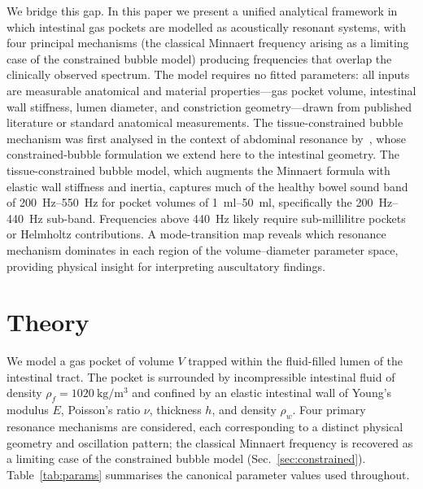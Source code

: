 \documentclass[12pt]{article}
\begin{document}
We bridge this gap.  In this paper we present a unified analytical framework
in which intestinal gas pockets are modelled as acoustically resonant systems,
with four principal mechanisms (the classical Minnaert frequency arising as a
limiting case of the constrained bubble model) producing frequencies that
overlap the clinically observed spectrum.  The model requires no fitted parameters: all inputs are
measurable anatomical and material properties---gas pocket volume, intestinal
wall stiffness, lumen diameter, and constriction geometry---drawn from
published literature or standard anatomical measurements.  The
tissue-constrained bubble mechanism was first analysed in the context of
abdominal resonance by~\cite{Mace2026gaspockets}, whose constrained-bubble
formulation we extend here to the intestinal geometry.  The
tissue-constrained bubble model, which augments the Minnaert formula with
elastic wall stiffness and inertia, captures much of the healthy bowel sound band
of \SIrange{200}{550}{\hertz} for pocket volumes of
\SIrange{1}{50}{\milli\litre}, specifically the \SIrange{200}{440}{\hertz}
sub-band.  Frequencies above \SI{440}{\hertz} likely require sub-millilitre
pockets or Helmholtz contributions.  A mode-transition map reveals which resonance
mechanism dominates in each region of the volume--diameter parameter space,
providing physical insight for interpreting auscultatory findings.

\section{Theory}
\label{sec:theory}

We model a gas pocket of volume $V$ trapped within the fluid-filled lumen of
the intestinal tract.  The pocket is surrounded by incompressible intestinal
fluid of density $\rho_f = \SI{1020}{\kilogram\per\metre\cubed}$ and confined
by an elastic intestinal wall of Young's modulus $E$, Poisson's ratio $\nu$,
thickness $h$, and density $\rho_w$.  Four primary resonance mechanisms are
considered, each corresponding to a distinct physical geometry and oscillation
pattern; the classical Minnaert frequency is recovered as a limiting case of
the constrained bubble model (Sec.~\ref{sec:constrained}).  Table~\ref{tab:params} summarises the canonical parameter values
used throughout.
\end{document}

